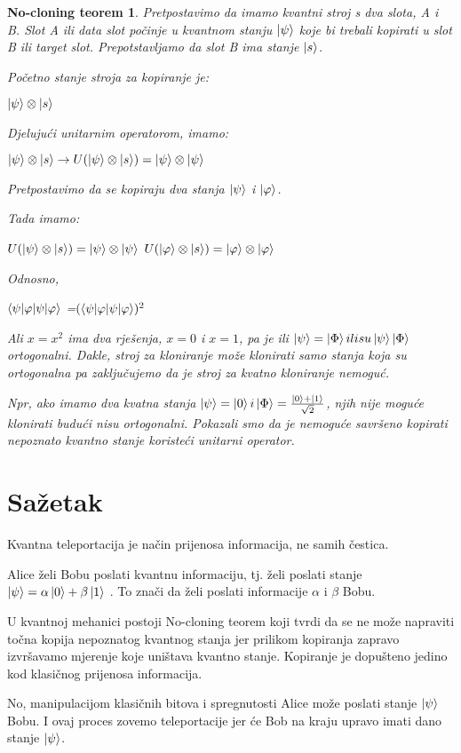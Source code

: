\documentclass{article}
\newtheorem{thm}{No-cloning teorem}
\begin{document}
\begin{thm} 
	Pretpostavimo da imamo kvantni stroj s dva slota, A i B. Slot A ili data slot počinje u kvantnom stanju $\ket{\psi}$ koje bi trebali kopirati u slot B ili target slot. Prepotstavljamo da slot B ima stanje  $\ket{s}$. 
	
	Početno stanje stroja za kopiranje je: 
	
	{\centering
		$\ket{\psi} 	\otimes \ket{s}$
		\par}
	
	Djelujući unitarnim operatorom, imamo: 
	
	{\centering
		$\ket{\psi} 	\otimes \ket{s} \rightarrow U (\ket{\psi} 	\otimes \ket{s}) = \ket{\psi} 	\otimes \ket{\psi}$
		\par} 
	
	Pretpostavimo da se kopiraju dva stanja $\ket{\psi}$  i $\ket{\varphi}$. 
	
	Tada imamo: 
	
	{\centering
		$U (\ket{\psi} 	\otimes \ket{s}) = \ket{\psi} 	\otimes \ket{\psi}$
		$U (\ket{\varphi} 	\otimes \ket{s}) = \ket{\varphi} 	\otimes \ket{\varphi}$
		\par}
	
	Odnosno, 
	
	{\centering
		$\braket{\psi|\varphi}$ =$ (\braket{\psi|\varphi})^2$ 
		\par}
	
	Ali $x = x^2$ ima dva rješenja, $x = 0$ i $x = 1$, pa je ili $ \ket {\psi} = \ket {\Phi}  ili  su  \ket {\psi} \ket {\Phi}$  ortogonalni.
	Dakle, stroj za kloniranje može klonirati samo stanja koja su ortogonalna pa zaključujemo da je stroj za kvatno kloniranje nemoguć.
	
	Npr, ako imamo dva kvatna stanja $\ket {\psi} = \ket {0} i \ket {\Phi} =\frac{\ket {0} + \ket {1}}{\sqrt{2}} $, njih nije moguće klonirati budući nisu ortogonalni.
	Pokazali smo da je nemoguće savršeno kopirati nepoznato kvantno stanje koristeći unitarni operator.
\end{thm}
\newpage
\section{Sažetak}

Kvantna teleportacija je način prijenosa informacija, ne samih čestica. \newline

Alice želi Bobu poslati kvantnu informaciju, tj. želi poslati stanje   $\ket{\psi} = \alpha\ket{0} +\beta \ket {1}$ .
To znači da želi poslati informacije $\alpha$ i $\beta $ Bobu. \newline

U kvantnoj mehanici postoji No-cloning teorem koji tvrdi da se ne može napraviti točna kopija nepoznatog kvantnog stanja jer prilikom kopiranja zapravo izvršavamo mjerenje koje uništava kvantno stanje. Kopiranje je dopušteno jedino kod klasičnog prijenosa informacija.\newline

No, manipulacijom klasičnih bitova i spregnutosti Alice može poslati stanje $\ket{\psi}$
Bobu. I ovaj proces zovemo teleportacije jer će Bob na kraju upravo imati dano stanje $\ket{\psi}$. 
\end{document}
